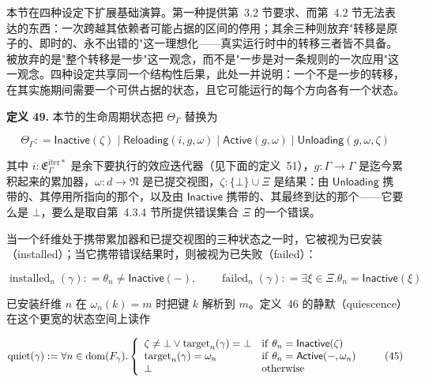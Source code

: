 \documentclass[
  10
]{article}
\begin{document}
本节在四种设定下扩展基础演算。第一种提供第~3.2 节要求、而第~4.2 节无法表达的东西：一次跨越其依赖者可能占据的区间的停用；其余三种则放弃"转移是原子的、即时的、永不出错的"这一理想化——真实运行时中的转移三者皆不具备。被放弃的是"整个转移是一步"这一观念，而不是"一步是对一条规则的一次应用"这一观念。四种设定共享同一个结构性后果，此处一并说明：一个不是一步的转移，在其实施期间需要一个可供占据的状态，且它可能运行的每个方向各有一个状态。

\textbf{定义 49.} 本节的生命周期状态把 \(\Theta _ { \Gamma }\) 替换为

\[
\Theta _ { \Gamma } : = \mathsf { I n a c t i v e } ( \zeta ) \mid \mathsf { R e l o a d i n g } ( i , g , \omega ) \mid \mathsf { A c t i v e } ( g , \omega ) \mid \mathsf { U n l o a d i n g } ( g , \omega , \zeta )\tag{43}
\]

其中 \(i : \mathfrak { E } _ { \Gamma } ^ { \mathrm { i t e r * } }\) 是余下要执行的效应迭代器（见下面的定义~51），\(g : \Gamma \to \Gamma\) 是迄今累积起来的累加器，\(\omega : d \to \mathfrak { N}\) 是已提交视图，\(\zeta : \{ \bot \} \cup \Xi\) 是结果：由 \(\mathsf { U n l o a d i n g }\) 携带的、其停用所指向的那个，以及由 \(\mathsf { I n a c t i v e }\) 携带的、其最终到达的那个——它要么是 \(\bot\)，要么是取自第~4.3.4 节所提供错误集合 \(\Xi\) 的一个错误。

当一个纤维处于携带累加器和已提交视图的三种状态之一时，它被视为已安装（installed）；当它携带错误结果时，则被视为已失败（failed）：

\[
\operatorname { i n s t a l l e d } _ { n } ( \gamma ) : = \theta _ { n } \neq \mathsf { I n a c t i v e } ( - ) , \qquad \operatorname { f a i l e d } _ { n } ( \gamma ) : = \exists \xi \in \Xi . \theta _ { n } = \mathsf { I n a c t i v e } ( \xi )\tag{44}
\]

已安装纤维 \(n\) 在 \(\omega _ { n } ( k ) = m\) 时把键 \(k\) 解析到 \(m\)。定义~46 的静默（quiescence）在这个更宽的状态空间上读作

\[
\mathrm { q u i e t } ( \gamma ) : = \forall n \in \mathrm { d o m } ( F _ { \gamma } ) . \left\{ \begin{array} { l l } { \zeta \neq \bot \vee \mathrm { t a r g e t } _ { n } ( \gamma ) = \bot } & { \mathrm { i f ~ } \theta _ { n } = \mathsf { I n a c t i v e } ( \zeta ) } \\ { \mathrm { t a r g e t } _ { n } ( \gamma ) = \omega _ { n } } & { \mathrm { i f ~ } \theta _ { n } = \mathsf { A c t i v e } ( - , \omega _ { n } ) } \\ { \bot } & { \mathrm { o t h e r w i s e } } \end{array} \right.\tag{45}
\]
\end{document}
